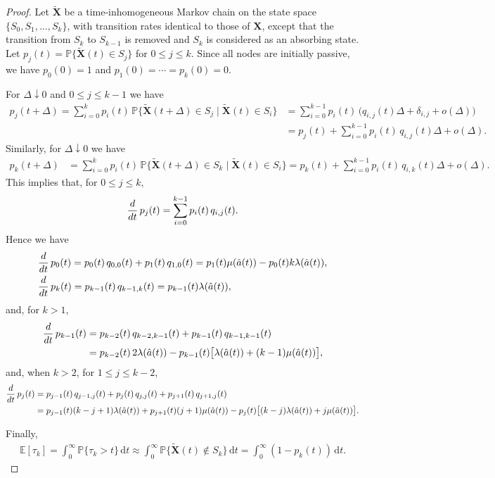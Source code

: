 \documentclass[10pt,a4paper]{amsart}
\newcommand{\E}{\mathbb{E}}
\newcommand{\X}{\mathbf{X}}
\newcommand{\ddd}{{\rm d}}
\newcommand{\dd}{\mathrm{d}}
\renewcommand{\P}{\mathbb{P}}
\begin{document}
\begin{proof}
Let $\tilde{\mathbf{X}}$ be a time-inhomogeneous Markov chain on the state space $\{S_0, S_1, \ldots, S_k\}$, with transition rates identical to those of $\mathbf{X}$, except that the transition from $S_k$ to $S_{k-1}$ is removed and $S_k$ is considered as an absorbing state. Let $p_{j}(t)=\P\{\tilde{\X}(t)\in S_{j}\}$ for $0\leq j\leq k$. Since all nodes are initially passive, we have $p_{0}(0)=1$ and $p_{1}(0)=\cdots =p_{k}(0)=0$. 

For $\Delta \downarrow 0$ and $0\leq j\leq k-1$ we have
\begin{align*}
p_{j}(t+\Delta) = \sum_{i=0}^{k}p_{i}(t)\, \P\big\{\tilde{\X} (t+\Delta)\in S_{j}\mid \tilde{\X} (t)\in S_{i}\big\}&
= \sum_{i=0}^{k-1}p_{i}(t)\, \big( q_{i,j}(t)\Delta + \delta_{i,j} +o(\Delta)\big)\\&
=p_{j}(t)+\sum_{i=0}^{k-1}p_{i}(t)\, q_{i,j}(t)\Delta +o(\Delta).
\end{align*}
Similarly, for $\Delta \downarrow 0$ we have
\begin{align*}
p_{k}(t+\Delta) &= \sum_{i=0}^{k}p_{i}(t)\, \P\big\{\tilde{\X} (t+\Delta)\in S_{k}\mid \tilde{\X} (t)\in S_{i}\big\}
= p_{k}(t)+ \sum_{i=0}^{k-1}p_{i}(t)\, q_{i,k}(t)\Delta +o(\Delta).
\end{align*}
This implies that, for $0\leq j\leq k$,
\begin{align*}
\frac{\ddd}{\ddd t}\,p_{j}(t)=\sum_{i=0}^{k-1}p_{i}(t)\, q_{i,j}(t).
\end{align*}
Hence we have
\begin{align*}
&\frac{\ddd}{\ddd t}\,p_{0}(t)=p_{0}(t)\, q_{0,0}(t)+p_{1}(t)\, q_{1,0}(t)=p_{1}(t)\mu(\hat{a}(t))-p_{0}(t)k\lambda(\hat{a}(t)),
\\&\frac{\ddd}{\ddd t}\,p_{k}(t)=p_{k-1}(t)\, q_{k-1,k}(t)=p_{k-1}(t) \lambda(\hat{a}(t)),
\end{align*}
and, for $k>1$,
\begin{align*}
\frac{\ddd}{\ddd t}\,p_{k-1}(t)&=p_{k-2}(t)\, q_{k-2,k-1}(t)+p_{k-1}(t)\, q_{k-1,k-1}(t)\\&
=p_{k-2}(t)\, 2\lambda(\hat{a}(t))-p_{k-1}(t)\big[\lambda(\hat{a}(t)) + (k-1)\mu(\hat{a}(t))\big],
\end{align*}
and, when $k>2$, for $1\leq j\leq k-2$,
\begin{align*}
\frac{\ddd}{\ddd t}\,p_{j}(t)&=p_{j-1}(t)\, q_{j-1,j}(t)+p_{j}(t)\, q_{j,j}(t)+p_{j+1}(t)\, q_{j+1,j}(t)\\&
=p_{j-1}(t)(k-j+1) \lambda(\hat{a}(t))+p_{j+1}(t) (j+1)\mu(\hat{a}(t))-p_{j}(t)\big[(k - j)\lambda(\hat{a}(t)) + j\mu(\hat{a}(t))\big] .
\end{align*}

Finally, 
\begin{align*}
\E[\tau_{k}]=\int_{0}^{\infty}\P\{\tau_{k}>t\}\, \dd t\approx\int_{0}^{\infty}\P\{\tilde{\X}(t)\notin S_{k}\}\, \dd t=\int_{0}^{\infty}(1-p_{k}(t))\, \dd t.
\end{align*}
\end{proof}
\end{document}
